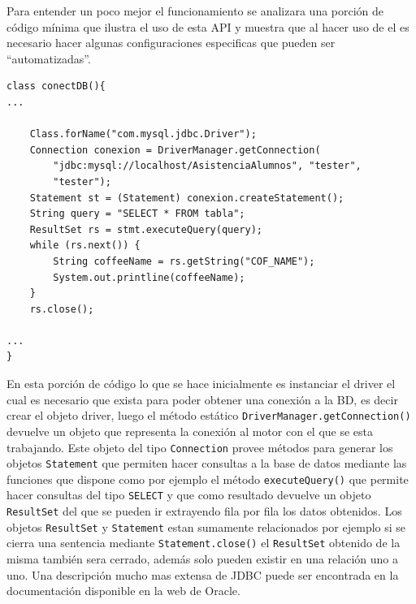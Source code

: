 Para entender un poco mejor el funcionamiento se analizara una porción de código mínima que ilustra el uso de esta API y muestra que al hacer uso de el es necesario hacer algunas configuraciones especificas que pueden ser ``automatizadas''.
%
\begin{lstlisting}[title=Porción de código java para la conexión a una base de datos]
class conectDB(){
...

	Class.forName("com.mysql.jdbc.Driver");
	Connection conexion = DriverManager.getConnection(
		"jdbc:mysql://localhost/AsistenciaAlumnos", "tester",
		"tester");
	Statement st = (Statement) conexion.createStatement();
	String query = "SELECT * FROM tabla";
	ResultSet rs = stmt.executeQuery(query);
	while (rs.next()) {
		String coffeeName = rs.getString("COF_NAME");
		System.out.printline(coffeeName);
	}
	rs.close();

...
}
\end{lstlisting}

En esta porción de código lo que se hace inicialmente es instanciar el driver el cual es necesario que exista para poder obtener una conexión a la BD, es decir crear el objeto driver, luego el método estático \verb=DriverManager.getConnection()= devuelve un objeto que representa la conexión al motor con el que se esta trabajando. Este objeto del tipo \verb=Connection= provee métodos para generar los objetos \verb=Statement= que   permiten hacer consultas a la base de datos mediante las funciones que dispone como por ejemplo el método \verb=executeQuery()= que permite hacer consultas del tipo \verb=SELECT= y que como resultado devuelve un objeto \verb=ResultSet= del que se pueden ir extrayendo fila por fila los datos obtenidos. Los objetos \verb=ResultSet= y \verb=Statement= estan sumamente relacionados por ejemplo si se cierra una sentencia mediante \verb=Statement.close()= el \verb=ResultSet= obtenido de la misma también sera cerrado, además solo pueden existir en una relación uno a uno. Una descripción mucho mas extensa de JDBC puede ser encontrada en la documentación disponible en la web de Oracle\citep{java:jdbc}.
%
